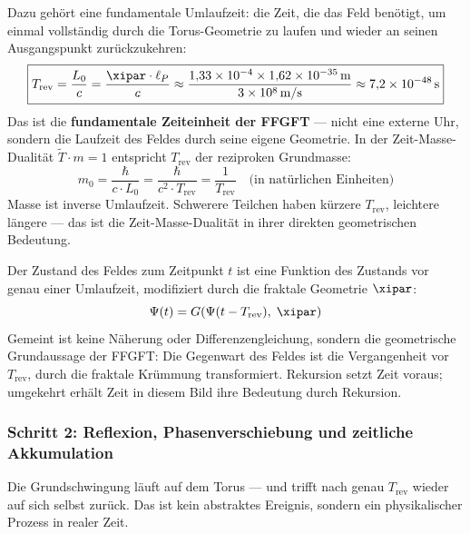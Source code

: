Dazu gehört eine fundamentale Umlaufzeit: die Zeit, die das Feld benötigt,
um einmal vollständig durch die Torus-Geometrie zu laufen und wieder an seinen
Ausgangspunkt zurückzukehren:
\begin{equation}
    \boxed{T_\text{rev} = \frac{L_0}{c} = \frac{\xipar \cdot \ell_P}{c}
    \approx \frac{1{,}33 \times 10^{-4} \times 1{,}62 \times 10^{-35}\,\text{m}}{3 \times 10^8\,\text{m/s}}
    \approx 7{,}2 \times 10^{-48}\,\text{s}}
    \label{eq:Trev}
\end{equation}
Das ist die \textbf{fundamentale Zeiteinheit der FFGFT} — nicht eine externe Uhr,
sondern die Laufzeit des Feldes durch seine eigene Geometrie. In der
Zeit-Masse-Dualität $\tilde{T} \cdot m = 1$ entspricht $T_\text{rev}$ der
reziproken Grundmasse:
\begin{equation}
    m_0 = \frac{\hbar}{c \cdot L_0} = \frac{\hbar}{c^2 \cdot T_\text{rev}}
    = \frac{1}{T_\text{rev}} \quad \text{(in natürlichen Einheiten)}
\end{equation}
Masse ist inverse Umlaufzeit. Schwerere Teilchen haben kürzere $T_\text{rev}$,
leichtere längere — das ist die Zeit-Masse-Dualität in ihrer direkten geometrischen
Bedeutung.

\begin{foundation}
Der Zustand des Feldes zum Zeitpunkt $t$ ist eine Funktion des Zustands
vor genau einer Umlaufzeit, modifiziert durch die fraktale Geometrie $\xipar$:
\begin{equation}
    \Psi(t) = G\!\left(\Psi(t - T_\text{rev}),\; \xipar\right)
    \label{eq:recursion}
\end{equation}
Gemeint ist keine Näherung oder Differenzengleichung, sondern die geometrische
Grundaussage der FFGFT: Die Gegenwart des Feldes ist die Vergangenheit vor
$T_\text{rev}$, durch die fraktale Krümmung transformiert. Rekursion setzt Zeit
voraus; umgekehrt erhält Zeit in diesem Bild ihre Bedeutung durch Rekursion.
\end{foundation}

\subsubsection*{Schritt 2: Reflexion, Phasenverschiebung und zeitliche Akkumulation}

Die Grundschwingung läuft auf dem Torus — und trifft nach genau $T_\text{rev}$
wieder auf sich selbst zurück. Das ist kein abstraktes Ereignis, sondern ein
physikalischer Prozess in realer Zeit.

